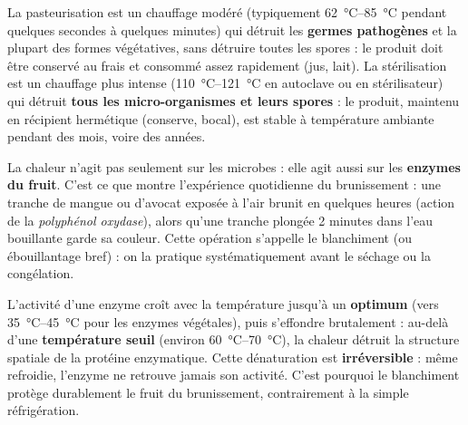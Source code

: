 \documentclass[11pt]{article}
\newcommand{\cle}[1]{{\popxbold\color{popdark}#1}}
\begin{document}
\begin{definition}
La \cle{pasteurisation} est un chauffage modéré (typiquement \SIrange{62}{85}{\celsius} pendant quelques secondes à quelques minutes) qui détruit les \textbf{germes pathogènes} et la plupart des formes végétatives, sans détruire toutes les spores : le produit doit être conservé au frais et consommé assez rapidement (jus, lait). La \cle{stérilisation} est un chauffage plus intense (\SIrange{110}{121}{\celsius} en autoclave ou en stérilisateur) qui détruit \textbf{tous les micro-organismes et leurs spores} : le produit, maintenu en récipient hermétique (conserve, bocal), est stable à température ambiante pendant des mois, voire des années.
\end{definition}

La chaleur n'agit pas seulement sur les microbes : elle agit aussi sur les \textbf{enzymes du fruit}. C'est ce que montre l'expérience quotidienne du brunissement : une tranche de mangue ou d'avocat exposée à l'air brunit en quelques heures (action de la \emph{polyphénol oxydase}), alors qu'une tranche plongée 2 minutes dans l'eau bouillante garde sa couleur. Cette opération s'appelle le \cle{blanchiment} (ou ébouillantage bref) : on la pratique systématiquement avant le séchage ou la congélation.

\begin{propriete}
L'activité d'une enzyme croît avec la température jusqu'à un \textbf{optimum} (vers \SIrange{35}{45}{\celsius} pour les enzymes végétales), puis s'effondre brutalement : au-delà d'une \textbf{température seuil} (environ \SIrange{60}{70}{\celsius}), la chaleur détruit la structure spatiale de la protéine enzymatique. Cette \cle{dénaturation} est \textbf{irréversible} : même refroidie, l'enzyme ne retrouve jamais son activité. C'est pourquoi le blanchiment protège durablement le fruit du brunissement, contrairement à la simple réfrigération.
\end{propriete}
\end{document}
